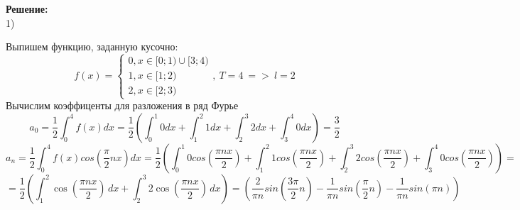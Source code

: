\documentclass{article}
\begin{document}
\textbf{Решение:}\\
1)
\begin{center}
\end{center} 
Выпишем функцию, заданную кусочно:\\
\begin{equation*}
    f(x)=
    \begin{cases}
        0, x \in [0;1) \cup [3;4)\\
        1, x \in [1;2)\\
        2, x \in [2;3)
    \end{cases},\ T=4\ =>\ l=2
\end{equation*} 
Вычислим коэффиценты для разложения в ряд Фурье
\[
    a_0=\frac{1}{2}\int_{0}^{4}f(x)dx = \frac{1}{2}(\int_{0}^{1}0dx+\int_{1}^{2}1dx+\int_{2}^{3}2dx+\int_{3}^{4}0dx)=\frac{3}{2}
\]
\[
    a_n = \frac{1}{2}\int_{0}^{4}f(x)cos\left(\frac{\pi}{2}nx\right)dx=\frac{1}{2}\left(\int_{0}^{1}0cos\left(\frac{\pi nx}{2}\right)+\int_{1}^{2}1cos\left(\frac{\pi nx}{2}\right)+ \int_{2}^{3}2cos\left(\frac{\pi nx}{2}\right)+ \int_{3}^{4}0cos\left(\frac{\pi nx}{2}\right)\right)=
\]
\[=\frac{1}{2} \left(\int_{1}^{2} \cos\left(\frac{\pi nx}{2}\right) \, dx + \int_{2}^{3} 2 \cos\left(\frac{\pi nx}{2}\right) \, dx\right)= \left(\frac{2}{\pi n}sin(\frac{3\pi}{2} n)-\frac{1}{\pi n}sin\left(\frac{\pi}{2}n\right)-\frac{1}{\pi n}sin\left(\pi n\right)\right)\]
\end{document}

